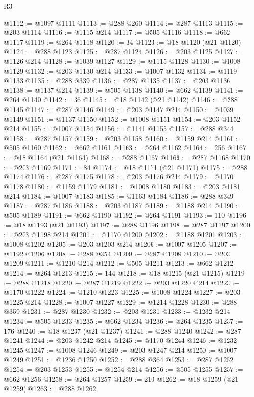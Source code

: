 \begin{lexlean}{R3}
\begin{coremodule}
@1112 := @1097 @1111
@1113 := @288 @260
@1114 := @287 @1113
@1115 := @203 @1114
@1116 := @1115 @214
@1117 := @505 @1116
@1118 := @662 @1117
@1119 := @264 @1118
@1120 := 34
@1123 := @18 @1120 (@21 @1120)
@1124 := @288 @1123
@1125 := @287 @1124
@1126 := @203 @1125
@1127 := @1126 @214
@1128 := @1039 @1127
@1129 := @1115 @1128
@1130 := @1008 @1129
@1132 := @203 @1130 @214
@1133 := @1007 @1132
@1134 := @1119 @1133
@1135 := @288 @339
@1136 := @287 @1135
@1137 := @203 @1136
@1138 := @1137 @214
@1139 := @505 @1138
@1140 := @662 @1139
@1141 := @264 @1140
@1142 := 36
@1145 := @18 @1142 (@21 @1142)
@1146 := @288 @1145
@1147 := @287 @1146
@1149 := @203 @1147 @214
@1150 := @1039 @1149
@1151 := @1137 @1150
@1152 := @1008 @1151
@1154 := @203 @1152 @214
@1155 := @1007 @1154
@1156 := @1141 @1155
@1157 := @288 @344
@1158 := @287 @1157
@1159 := @203 @1158
@1160 := @1159 @214
@1161 := @505 @1160
@1162 := @662 @1161
@1163 := @264 @1162
@1164 := 256
@1167 := @18 @1164 (@21 @1164)
@1168 := @288 @1167
@1169 := @287 @1168
@1170 := @203 @1169
@1171 := 84
@1174 := @18 @1171 (@21 @1171)
@1175 := @288 @1174
@1176 := @287 @1175
@1178 := @203 @1176 @214
@1179 := @1170 @1178
@1180 := @1159 @1179
@1181 := @1008 @1180
@1183 := @203 @1181 @214
@1184 := @1007 @1183
@1185 := @1163 @1184
@1186 := @288 @349
@1187 := @287 @1186
@1188 := @203 @1187
@1189 := @1188 @214
@1190 := @505 @1189
@1191 := @662 @1190
@1192 := @264 @1191
@1193 := 110
@1196 := @18 @1193 (@21 @1193)
@1197 := @288 @1196
@1198 := @287 @1197
@1200 := @203 @1198 @214
@1201 := @1170 @1200
@1202 := @1188 @1201
@1203 := @1008 @1202
@1205 := @203 @1203 @214
@1206 := @1007 @1205
@1207 := @1192 @1206
@1208 := @288 @354
@1209 := @287 @1208
@1210 := @203 @1209
@1211 := @1210 @214
@1212 := @505 @1211
@1213 := @662 @1212
@1214 := @264 @1213
@1215 := 144
@1218 := @18 @1215 (@21 @1215)
@1219 := @288 @1218
@1220 := @287 @1219
@1222 := @203 @1220 @214
@1223 := @1170 @1222
@1224 := @1210 @1223
@1225 := @1008 @1224
@1227 := @203 @1225 @214
@1228 := @1007 @1227
@1229 := @1214 @1228
@1230 := @288 @359
@1231 := @287 @1230
@1232 := @203 @1231
@1233 := @1232 @214
@1234 := @505 @1233
@1235 := @662 @1234
@1236 := @264 @1235
@1237 := 176
@1240 := @18 @1237 (@21 @1237)
@1241 := @288 @1240
@1242 := @287 @1241
@1244 := @203 @1242 @214
@1245 := @1170 @1244
@1246 := @1232 @1245
@1247 := @1008 @1246
@1249 := @203 @1247 @214
@1250 := @1007 @1249
@1251 := @1236 @1250
@1252 := @288 @364
@1253 := @287 @1252
@1254 := @203 @1253
@1255 := @1254 @214
@1256 := @505 @1255
@1257 := @662 @1256
@1258 := @264 @1257
@1259 := 210
@1262 := @18 @1259 (@21 @1259)
@1263 := @288 @1262

\end{coremodule}
\end{lexlean}
